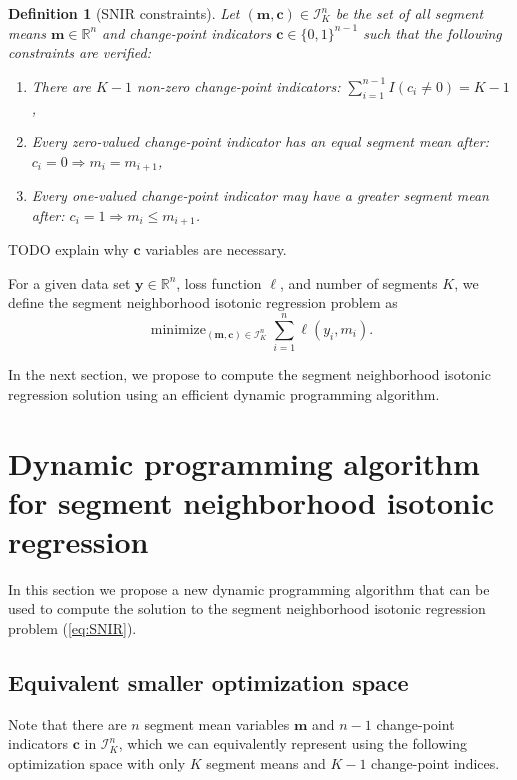\documentclass{article}
\newtheorem{definition}{Definition}
\DeclareMathOperator*{\minimize}{minimize}
\newcommand{\RR}{\mathbb R}
\begin{document}
\begin{definition}[SNIR constraints]
  \label{def:I}
  Let $(\mathbf m, \mathbf c)\in\mathcal I_K^n$ be the set of all segment means
  $\mathbf m\in\RR^n$ and change-point indicators
  $\mathbf c\in\{0,1\}^{n-1}$ such that the following constraints are
  verified:
  \begin{enumerate}
  \item There are $K-1$ non-zero change-point indicators:
    $\sum_{i=1}^{n-1} I(c_i \neq 0) = K-1$,
  \item Every zero-valued change-point indicator has an equal segment mean
  after: $c_i = 0 \Rightarrow m_i = m_{i+1}$, 
  \item Every one-valued
    change-point indicator may have a greater segment mean after:
    $c_i = 1 \Rightarrow m_i \leq m_{i+1}$.
  \end{enumerate}
\end{definition}

TODO explain why $\mathbf c$ variables are necessary.

For a given data set $\mathbf y\in\RR^n$, loss function $\ell$, and
number of segments $K$, we define the segment neighborhood isotonic regression
problem as
\begin{equation}
  \label{eq:SNIR}
  \minimize_{(\mathbf m, \mathbf c)\in\mathcal I_K^n} \sum_{i=1}^n \ell(y_i, m_i).
\end{equation}

In the next section, we propose to compute the segment neighborhood
isotonic regression solution using an efficient dynamic programming
algorithm.

\newcommand{\FCC}{C}
\newcommand{\M}{\mathcal{M}}
\section{Dynamic programming algorithm for segment neighborhood isotonic regression}

In this section we propose a new dynamic programming algorithm that
can be used to compute the solution to the segment neighborhood
isotonic regression problem (\ref{eq:SNIR}). 

\subsection{Equivalent smaller optimization space}

Note that there are $n$
segment mean variables $\mathbf m$ and $n-1$ change-point indicators
$\mathbf c$ in $\mathcal I_K^n$, which we can equivalently represent
using the following optimization space with only $K$ segment means and
$K-1$ change-point indices.
\end{document}
